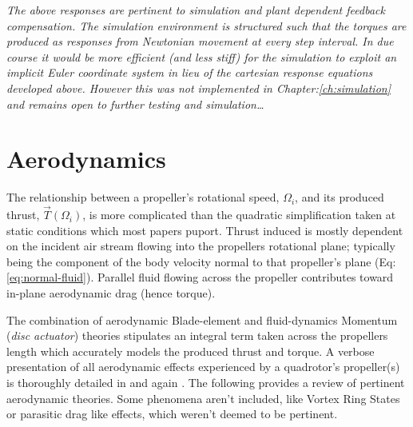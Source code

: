 \par
\emph{\color{Gray}The above responses are pertinent to simulation and plant dependent feedback compensation. The simulation environment is structured such that the torques are produced as responses from Newtonian movement at every step interval. In due course it would be more efficient (and less stiff) for the simulation to exploit an implicit Euler\cite{physicallybased,multibodydynamics} coordinate system in lieu of the cartesian response equations developed above. However this was not implemented in Chapter:\ref{ch:simulation} and remains open to further testing and simulation\ldots}
\section{Aerodynamics}
\label{sec:dynamics.aero}
The relationship between a propeller's rotational speed, $\Omega_i$, and its produced thrust, $\vec{T}(\Omega_i)$, is more complicated than the quadratic simplification taken at static conditions which most papers puport. Thrust induced is mostly dependent on the incident air stream flowing into the propellers rotational plane; typically being the component of the body velocity normal to that propeller's plane (Eq:\ref{eq:normal-fluid}). Parallel fluid flowing across the propeller contributes toward in-plane aerodynamic drag (hence torque). 
\par
The combination of aerodynamic Blade-element\cite{bem,forwarddescent} and fluid-dynamics Momentum (\emph{disc actuator}) theories stipulates an integral term taken across the propellers length which accurately models the produced thrust and torque. A verbose presentation of all aerodynamic effects experienced by a quadrotor's propeller(s) is thoroughly detailed in \cite{bladesforquadrotors} and again \cite{nonlineardynamics}. The following provides a review of pertinent aerodynamic theories. Some phenomena aren't included, like Vortex Ring States or parasitic drag like effects, which weren't deemed to be pertinent.
